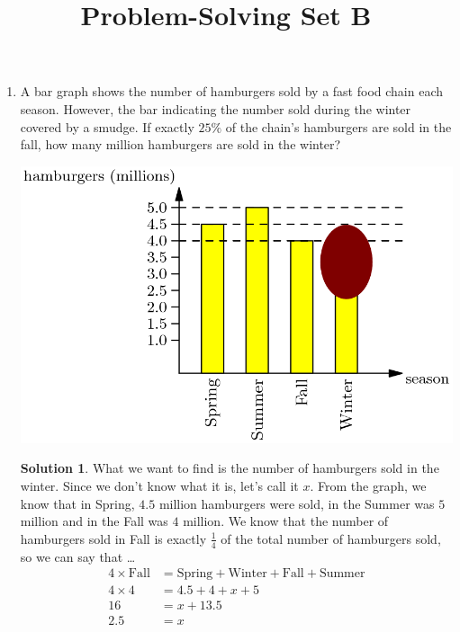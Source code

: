 \documentclass{article}
\title{Problem-Solving Set B}
\author{}
\date{}
\theoremstyle{definition}
\newtheorem*{solution}{Solution}
\begin{document}
\maketitle
\begin{multicols*}{2}
    \begin{enumerate}
        \item A bar graph shows the number of hamburgers sold by a fast food chain each season.
            However, the bar indicating the number sold during the winter covered by a smudge.
            If exactly $25\%$ of the chain's hamburgers are sold in the fall, how many million hamburgers are sold in the winter?
            \begin{center}
                \includegraphics[scale=0.2]{5-2_bar_graph.png}
            \end{center}
            \begin{solution}
                What we want to find is the number of hamburgers sold in the winter.
                Since we don't know what it is, let's call it $x$.
                From the graph, we know that in Spring, $4.5$ million hamburgers were sold, in the Summer was $5$ million and in the Fall was $4$ million.
                We know that the number of hamburgers sold in Fall is exactly $\frac{1}{4}$ of the total number of hamburgers sold, so we can say that \dots
                \begin{align*}
                    4 \times \text{Fall} &= \text{Spring} + \text{Winter} + \text{Fall} + \text{Summer} \\
                    4 \times 4 &= 4.5 + 4 + x + 5 \\
                    16 &= x + 13.5 \\
                    2.5 &= x

\end{align*}
\end{solution}
\end{enumerate}
\end{multicols*}
\end{document}
